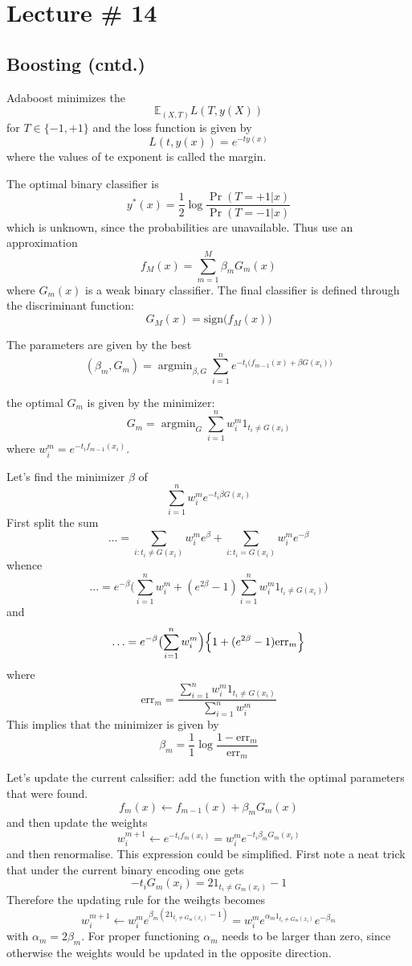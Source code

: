 \documentclass[a4paper]{article}
\newcommand{\ex}{\mathbb{E}}
\newcommand{\argmin}{\mathop{\text{argmin}}}
\begin{document}
\section{Lecture \# 14} %
\label{sec:lecture_14}

\subsection{Boosting (cntd.)} %
\label{sub:boosting_continued}

Adaboost minimizes the 
\[\ex_{(X,T)} L(T, y(X))\]
for $T\in \{-1,+1\}$ and the loss function is given by 
\[L(t, y(x)) = e^{-t y(x)}\]
where the values of te exponent is called the margin.

The optimal binary classifier is 
\[y^*(x) = \frac{1}{2} \log\frac{\Pr(T=+1\rvert x)}{\Pr(T=-1\rvert x)}\]
which is unknown, since the probabilities are unavailable. Thus use an approximation
\[f_M(x) = \sum_{m=1}^M \beta_m G_m(x)\]
where $G_m(x)$ is a weak binary classifier. The final classifier is defined through
the discriminant function:
\[G_M(x) = \text{sign}\bigl(f_M(x) \bigr)\]

The parameters are given by the best 
\[
(\beta_m, G_m)
= \argmin_{\beta, G} \sum_{i=1}^n e^{-t_i \bigl( f_{m-1}(x) + \beta G(x_i) \bigr) }\]

the optimal $G_m$ is given by the minimizer:
\[ G_m = \argmin_{G} \sum_{i=1}^n w^m_i 1_{t_i \neq G(x_i) } \]
where $w^m_i = e^{-t_i f_{m-1}(x_i)}$.

Let's find the minimizer $\beta$ of 
\[\sum_{i=1}^n w^m_i e^{-t_i \beta G(x_i) }\]
First split the sum
\[\ldots 
= \sum_{i: t_i \neq G(x_i)} w^m_i  e^\beta
+ \sum_{i: t_i = G(x_i)} w^m_i  e^{-\beta} \]
whence
\[\ldots 
= e^{-\beta} \bigl( \sum_{i=1}^n w^m_i 
+ (e^{2\beta}-1) \sum_{i=1}^n w^m_i 1_{t_i \neq G(x_i)}
\Bigr) \]
and
\[\ldots 
= e^{-\beta} \bigl( \sum_{i=1}^n w^m_i \Bigr) \Bigl\{ 
1 + (e^{2\beta}-1) \text{err}_m
\Bigr\} \]
where
\[\text{err}_m = \frac{\sum_{i=1}^n w^m_i 1_{t_i \neq G(x_i)}}{\sum_{i=1}^n w^m_i} \]
This implies that the minimizer is given by
\[
\beta_m = \frac{1}{1}\log \frac{1-\text{err}_m}{\text{err}_m}
\]

Let's update the current calssifier: add the function with the optimal parameters
that were found.
\[ f_m(x) \leftarrow f_{m-1}(x) + \beta_m G_m(x) \]
and then update the weights
\[
w^{m+1}_i \leftarrow e^{-t_i f_m(x_i)} = w^m_i e^{-t_i \beta_m G_m(x_i)}
\]
and then renormalise. This expression could be simplified. First note a neat trick
that under the current binary encoding one gets
\[ -t_i G_m(x_i) = 2 1_{t_i \neq G_m(x_i)} - 1 \]
Therefore the updating rule for the weihgts becomes 
\[
w^{m+1}_i
\leftarrow w^m_i e^{\beta_m ( 2 1_{t_i \neq G_m(x_i)} - 1 )}
= w^m_i e^{\alpha_m 1_{t_i \neq G_m(x_i)}} e^{-\beta_m}
\]
with $\alpha_m = 2\beta_m$. For proper functioning $\alpha_m$ needs to be larger than
zero, since otherwise the weights would be updated in the opposite direction.
\end{document}

